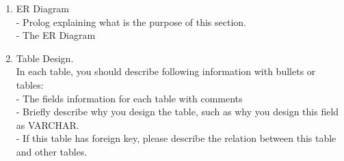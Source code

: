 \documentclass[12pt]{article}%
\begin{document}
\begin{enumerate}[4.a.]
    \item ER Diagram\\
     - Prolog explaining what is the purpose of this section.\\
     - The ER Diagram
    
    \item Table Design.\\
    In each table, you should describe following information with bullets or tables:\\
 - The fields information for each table with comments\\
 - Briefly describe why you design the table, such as why you design this field as VARCHAR.\\
 - If this table has foreign key, please describe the relation between this table and other tables.\\
    
    
\end{enumerate}

\end{document}
